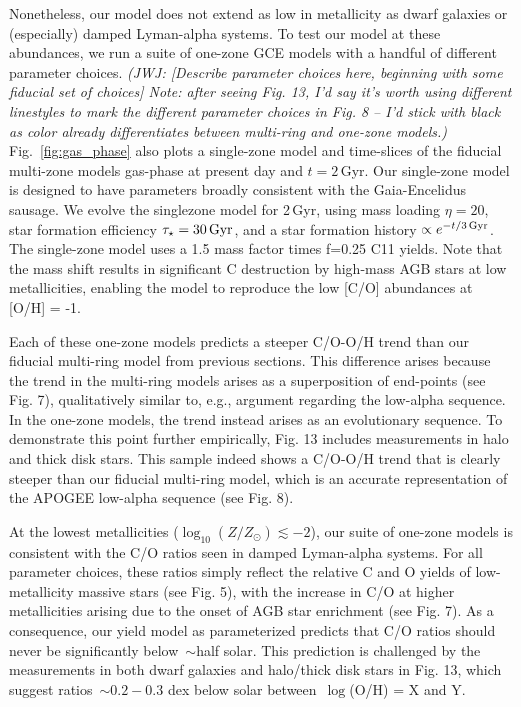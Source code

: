 \documentclass[fleqn,
usenatbib]{mnras}
\makeatletter
\DeclareRobustCommand\citepos
  {\begingroup
   \let\NAT@nmfmt\NAT@posfmt%
   \NAT@swafalse\let\NAT@ctype\z@\NAT@partrue
   \@ifstar{\NAT@fulltrue\NAT@citetp}{\NAT@fullfalse\NAT@citetp}}
\let\NAT@orig@nmfmt\NAT@nmfmt
\def\NAT@posfmt#1{\NAT@orig@nmfmt{#1's}}
\newcommand{\note}[1]{{\color{ForestGreen} \textit{ \small (JWJ: #1)}}}
\makeatother
\begin{document}
Nonetheless, our model does not extend as low in metallicity as dwarf galaxies
or (especially) damped Lyman-alpha systems.
To test our model at these abundances, we run a suite of one-zone GCE models
with a handful of different parameter choices.
\note{[Describe parameter choices here, beginning with some fiducial set of
choices] Note: after seeing Fig. 13, I'd say it's worth using different
linestyles to mark the different parameter choices in Fig. 8 -- I'd stick
with black as color already differentiates between multi-ring and one-zone
models.}
Fig.~\ref{fig:gas_phase} also plots a single-zone model and time-slices of the fiducial multi-zone models gas-phase at present day and $t=2$\,Gyr. 
Our single-zone model is designed to have parameters broadly consistent with the Gaia-Encelidus sausage.
We evolve the singlezone model for 2\,Gyr, using mass loading $\eta=20$, star formation efficiency $\tau_{\star}=30\,{\rm Gyr}$, and a star formation history $\propto e^{-t/3{\rm\,Gyr}}$.
The single-zone model uses a 1.5 mass factor times f=0.25 C11 yields. Note that the mass shift results in significant C destruction by high-mass AGB stars at low metallicities, enabling the model to reproduce the low [C/O] abundances at [O/H] = -1.



Each of these one-zone models predicts a steeper C/O-O/H trend than our
fiducial multi-ring model from previous sections.
This difference arises because the trend in the multi-ring models arises as a
superposition of end-points (see Fig. 7), qualitatively similar to, e.g.,
\citepos{schonrich-binney09} argument regarding
the low-alpha sequence.
In the one-zone models, the trend instead arises as an evolutionary sequence.
To demonstrate this point further empirically, Fig. 13 includes measurements
in halo and thick disk stars.
This sample indeed shows a C/O-O/H trend that is clearly steeper than our
fiducial multi-ring model, which is an accurate representation of the APOGEE
low-alpha sequence (see Fig. 8).

At the lowest metallicities ($\log_{10}(Z / Z_\odot) \lesssim -2$), our suite
of one-zone models is consistent with the C/O ratios seen in damped Lyman-alpha
systems.
For all parameter choices, these ratios simply reflect the relative C and O
yields of low-metallicity massive stars (see Fig. 5), with the increase in C/O
at higher metallicities arising due to the onset of AGB star enrichment (see
Fig. 7).
As a consequence, our yield model as parameterized predicts that C/O ratios
should never be significantly below~$\sim$half solar.
This prediction is challenged by the measurements in both dwarf galaxies and
halo/thick disk stars in Fig. 13, which suggest ratios~$\sim$$0.2 - 0.3$ dex
below solar between~$\log$(O/H) = X and Y.
\end{document}
